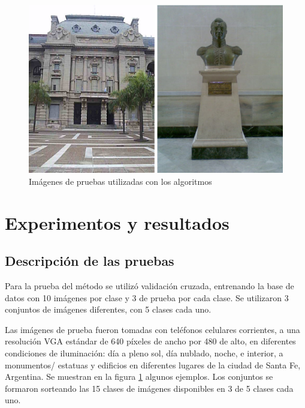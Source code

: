 \documentclass[conference,spanish,a4paper,10pt,oneside,final]{tfmpd}
\begin{document}
\subsection*{}
\begin{figure}
\begin{center}
\includegraphics[scale=0.25]{../diagramas/dibujo} 
\end{center}
\caption{Imágenes de pruebas utilizadas con los algoritmos}
\label{imagenes}
\end{figure}
%
%
%
%
\section{Experimentos y resultados}
%
%
\subsection{Descripción de las pruebas}
Para la prueba del método se utilizó validación cruzada, entrenando la base de
datos con 10 imágenes por clase y 3 de prueba por cada clase. Se utilizaron
3 conjuntos de imágenes diferentes, con 5 clases cada uno.

Las imágenes de prueba fueron tomadas con teléfonos celulares corrientes, a una
resolución VGA estándar de 640 píxeles de ancho por 480 de alto, en
diferentes condiciones
de iluminación: día a pleno sol, día nublado, noche, e interior, a monumentos/%
estatuas y edificios en diferentes lugares de la ciudad de Santa Fe, Argentina.
Se muestran en la figura \ref{imagenes} algunos ejemplos.
Los conjuntos se formaron sorteando las 15 clases de imágenes disponibles en
3 de 5 clases cada uno.
\end{document}

